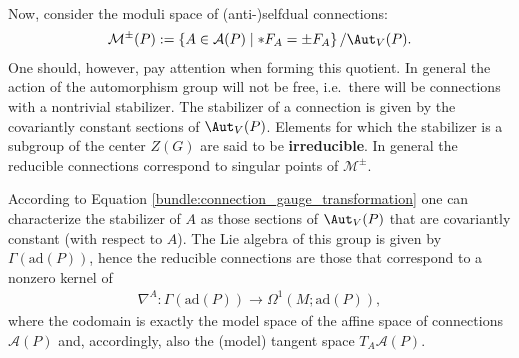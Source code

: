     Now, consider the moduli space of (anti-)selfdual connections:
    \begin{gather}
        \mathcal{M}^\pm(P) := \{A\in\mathcal{A}(P)\mid\ast F_A=\pm F_A\}\, / \Aut_V(P).
    \end{gather}
    One should, however, pay attention when forming this quotient. In general the action of the automorphism group will not be free, i.e.~there will be connections with a nontrivial stabilizer. The stabilizer of a connection is given by the covariantly constant sections of $\Aut_V(P)$. Elements for which the stabilizer is a subgroup of the center $Z(G)$ are said to be \textbf{irreducible}. In general the reducible connections correspond to singular points of $\mathcal{M}^\pm$.

    According to Equation \eqref{bundle:connection_gauge_transformation} one can characterize the stabilizer of $A$ as those sections of $\Aut_V(P)$ that are covariantly constant (with respect to $A$). The Lie algebra of this group is given by $\Gamma(\mathrm{ad}(P))$, hence the reducible connections are those that correspond to a nonzero kernel of
    \begin{gather}
        \nabla^A:\Gamma(\mathrm{ad}(P))\rightarrow\Omega^1(M;\mathrm{ad}(P)),
    \end{gather}
    where the codomain is exactly the model space of the affine space of connections $\mathcal{A}(P)$ and, accordingly, also the (model) tangent space $T_A\mathcal{A}(P)$.

